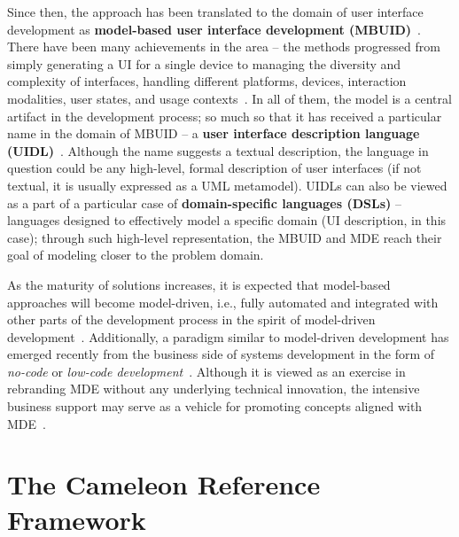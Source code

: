 Since then, the approach has been translated to the domain of user interface development as \textbf{model-based user interface development (MBUID)}~\cite{Puerta1994}.
There have been many achievements in the area – the methods progressed from simply generating a UI for a single device to managing the diversity and complexity of interfaces, handling different platforms, devices, interaction modalities, user states, and usage contexts~\cite{Meixner2011}.
In all of them, the model is a central artifact in the development process;
so much so that it has received a particular name in the domain of MBUID -- a \textbf{user interface description language (UIDL)}~\cite{guerrero_garcia_theoretical_2009}.
Although the name suggests a textual description, the language in question could be any high-level, formal description of user interfaces (if not textual, it is usually expressed as a UML metamodel).
UIDLs can also be viewed as a part of a particular case of \textbf{domain-specific languages (DSLs)} -- languages designed to effectively model a specific domain (UI description, in this case);
through such high-level representation, the MBUID and MDE reach their goal of modeling closer to the problem domain.

As the maturity of solutions increases, it is expected that model-based approaches will become model-driven, i.e., fully automated and integrated with other parts of the development process in the spirit of model-driven development~\cite{Ruiz2018}.
Additionally, a paradigm similar to model-driven development has emerged recently from the business side of systems development in the form of \emph{no-code} or \emph{low-code development}~\cite{Rymer2019}.
Although it is viewed as an exercise in rebranding MDE without any underlying technical innovation, the intensive business support may serve as a vehicle for promoting concepts aligned with MDE~\cite{Bock2021}.

\section{The Cameleon Reference Framework}\label{sec:the-cameleon-reference-framework}


